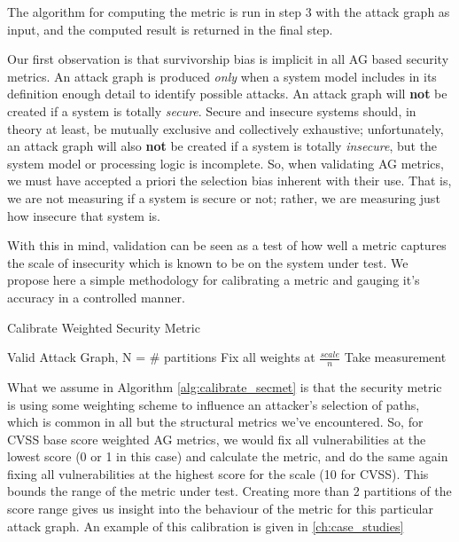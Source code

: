 The algorithm for computing the metric is run in step 3 with the attack graph as input, and the computed result is returned in the final step. 

Our first observation is that survivorship bias\cite{Wald_1980} is implicit in all AG based security metrics. An attack graph is produced \textit{only} when a system model includes in its definition enough detail to identify possible attacks. An attack graph will \textbf{not} be created if a system is totally \textit{secure}. Secure and insecure systems should, in theory at least, be mutually exclusive and collectively exhaustive; unfortunately, an attack graph will also \textbf{not} be created if a system is totally \textit{insecure}, but the system model or processing logic is incomplete. So, when validating AG metrics, we must have accepted a priori the selection bias inherent with their use. That is, we are not measuring if a system is secure or not; rather, we are measuring just how insecure that system is. 

With this in mind, validation can be seen as a test of how well a metric captures the scale of insecurity which is known to be on the system under test. We propose here a simple methodology for calibrating a metric and gauging it's accuracy in a controlled manner. 

\begin{algorithm}
\caption{Calibrate Weighted Security Metric}
\label{alg:calibrate_secmet}
\begin{algorithmic}
\REQUIRE Valid Attack Graph, N = \# partitions
 \STATE Fix all weights at $\frac{scale}{n}$ 
 \STATE Take measurement
\ENDFOR
 \end{algorithmic}
\end{algorithm}

What we assume in Algorithm \ref{alg:calibrate_secmet} is that the security metric is using some weighting scheme to influence an attacker's selection of paths, which is common in all but the structural metrics  we've encountered. So, for CVSS base score weighted AG metrics, we would fix all vulnerabilities at the lowest score (0 or 1 in this case) and calculate the metric, and do the same again fixing all vulnerabilities at the highest score for the scale (10 for CVSS). This bounds the range of the metric under test. Creating more than 2 partitions of the score range gives us insight into the behaviour of the metric for this particular attack graph. An example of this calibration is given in \ref{ch:case_studies}

